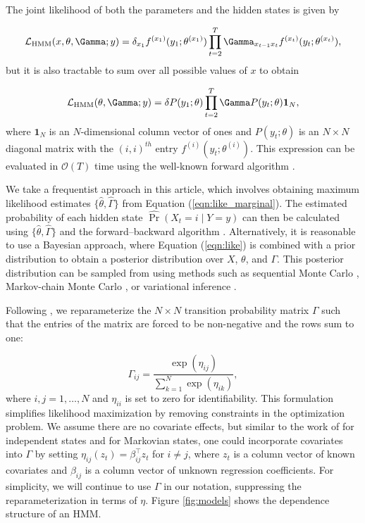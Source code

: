 The joint likelihood of both the parameters and the hidden states is given by

\begin{equation}
    \calL_{\text{HMM}}(x,\theta,\Gamma;y) = \delta_{x_1} f^{(x_1)}(y_1; \theta^{(x_1)}) \prod_{t=2}^T \Gamma_{x_{t-1} x_t} f^{(x_t)}(y_t; \theta^{(x_t)}),
    \label{eqn:like}
\end{equation}
%
but it is also tractable to sum over all possible values of $x$ to obtain

\begin{equation}
    \calL_{\text{HMM}}(\theta,\Gamma;y) = \delta P(y_1;\theta) \prod_{t=2}^T \Gamma P(y_t;\theta) \mathbf{1}_N,
    \label{eqn:like_marginal}
\end{equation}
%
where $\mathbf{1}_N$ is an $N$-dimensional column vector of ones and $P(y_t;\theta)$ is an $N \times N$ diagonal matrix with the $(i,i)^{th}$ entry $f^{(i)}(y_t; \theta^{(i)})$. This expression can be evaluated in $\mathcal{O}(T)$ time using the well-known forward algorithm \citep{Zucchini:2016}.

We take a frequentist approach in this article, which involves obtaining maximum likelihood estimates $\{\hat \theta, \hat \Gamma\}$ from Equation (\ref{eqn:like_marginal}). The estimated probability of each hidden state $\hat{\Pr}(X_t = i \mid Y = y)$ can then be calculated using $\{\hat \theta, \hat \Gamma\}$ and the forward--backward algorithm \citep{Zucchini:2016}. Alternatively, it is reasonable to use a Bayesian approach, where Equation (\ref{eqn:like}) is combined with a prior distribution to obtain a posterior distribution over $X$, $\theta$, and $\Gamma$. This posterior distribution can be sampled from using methods such as sequential Monte Carlo \citep{Douc:2011b}, Markov-chain Monte Carlo \citep{Scott:2002}, or variational inference \citep{Foti:2014}.
%

Following \citet{Barajas:2017}, we reparameterize the $N \times N$ transition probability matrix $\Gamma$ such that the entries of the matrix are forced to be non-negative and the rows sum to one:

\begin{equation*}
    \Gamma_{ij} = \frac{\exp(\eta_{ij})}{\sum_{k=1}^N \exp(\eta_{ik})}, 
\end{equation*}
%
where $i,j = 1,\ldots,N$ and $\eta_{ii}$ is set to zero for identifiability. This formulation simplifies likelihood maximization by removing constraints in the optimization problem. We assume there are no covariate effects, but similar to the work of \citet{DeSouza:2017} for independent states and \citet{Adam:2019} for Markovian states, one could incorporate covariates into $\Gamma$ by setting $\eta_{ij}(z_t) = \beta_{ij}^\top z_t$ for $i \neq j$, where $z_t$ is a column vector of known covariates and $\beta_{ij}$ is a column vector of unknown regression coefficients. For simplicity, we will continue to use $\Gamma$ in our notation, suppressing the reparameterization in terms of $\eta$. Figure \ref{fig:models} shows the dependence structure of an HMM.

